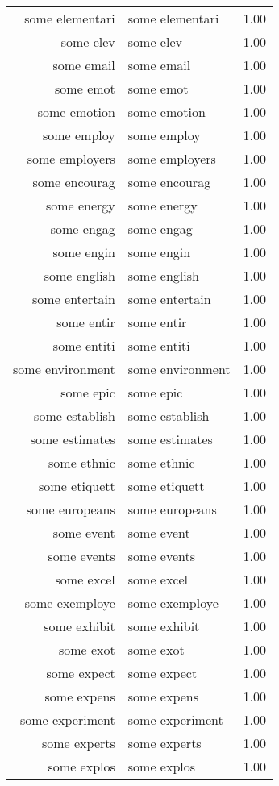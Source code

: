 \begin{table}[ht]
\begin{tabular}{rlr}
  some elementari & some elementari & 1.00 \\ 
  some elev & some elev & 1.00 \\ 
  some email & some email & 1.00 \\ 
  some emot & some emot & 1.00 \\ 
  some emotion & some emotion & 1.00 \\ 
  some employ & some employ & 1.00 \\ 
  some employers & some employers & 1.00 \\ 
  some encourag & some encourag & 1.00 \\ 
  some energy & some energy & 1.00 \\ 
  some engag & some engag & 1.00 \\ 
  some engin & some engin & 1.00 \\ 
  some english & some english & 1.00 \\ 
  some entertain & some entertain & 1.00 \\ 
  some entir & some entir & 1.00 \\ 
  some entiti & some entiti & 1.00 \\ 
  some environment & some environment & 1.00 \\ 
  some epic & some epic & 1.00 \\ 
  some establish & some establish & 1.00 \\ 
  some estimates & some estimates & 1.00 \\ 
  some ethnic & some ethnic & 1.00 \\ 
  some etiquett & some etiquett & 1.00 \\ 
  some europeans & some europeans & 1.00 \\ 
  some event & some event & 1.00 \\ 
  some events & some events & 1.00 \\ 
  some excel & some excel & 1.00 \\ 
  some exemploye & some exemploye & 1.00 \\ 
  some exhibit & some exhibit & 1.00 \\ 
  some exot & some exot & 1.00 \\ 
  some expect & some expect & 1.00 \\ 
  some expens & some expens & 1.00 \\ 
  some experiment & some experiment & 1.00 \\ 
  some experts & some experts & 1.00 \\ 
  some explos & some explos & 1.00 \\ 

\end{tabular}
\end{table}
